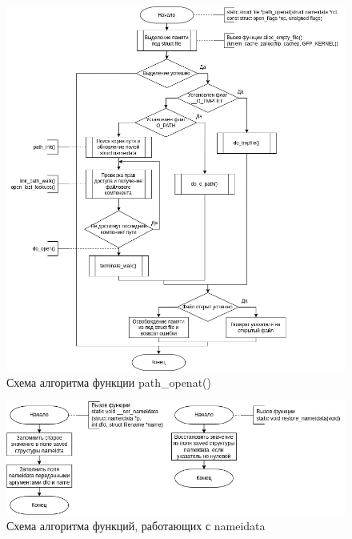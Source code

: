 \documentclass[14pt,a4paper]{scrreprt}
\begin{document}
\begin{figure}[H]
	\begin{center}
		\includegraphics[scale=0.52]{assets/path_openat.png}
	\end{center}
	\caption{Схема алгоритма функции path\_openat()}
\end{figure}

\begin{figure}[H]
	\begin{center}
		\includegraphics[scale=0.6]{assets/nameidata.png}
	\end{center}
	\caption{Схема алгоритма функций, работающих с nameidata}
\end{figure}
\end{document}
